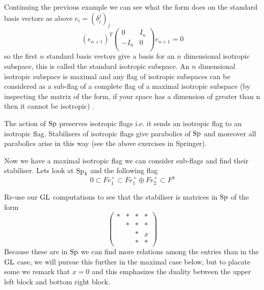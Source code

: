 \begin{example}
    Continuing the previous example we can see what the form does on the standard basis vectors as above \(e_i = (\delta_i^j)_{j}\)
        \[(e_{n+1})^T\begin{pmatrix}
            0 & I_n \\
            -I_n & 0\\
        \end{pmatrix}e_{n+1} = 0\] 
        so the first \(n\) standard basis vectors give a basis for an \(n\) dimensional isotropic subspace, this is called the standard isotropic subspace. An \(n\) dimensional isotropic subspace is maximal and any flag of isotropic subspaces can be considered as a sub-flag of a complete flag of a maximal isotropic subspace (by inspecting the matrix of the form, if your space has a dimension of greater than n then it cannot be isotropic) \cite[\S 8]{BuildingsClassicalGroups}.
\end{example}

The action of \(\operatorname{Sp}\) preserves isotropic flags i.e. it sends an isotropic flag to an isotropic flag. Stabilisers of isotropic flags give parabolics of \(\operatorname{Sp}\) and moreover all parabolics arise in this way (see the above exercises in Springer).

\begin{example}
        Now we have a maximal isotropic flag we can consider sub-flags and find their stabiliser. Lets look at \(\operatorname{Sp}_4\) and the following flag
        \[0 \subset Fe_1^+ \subset Fe_1^+ \oplus Fe^+_2 \subset F^4\]

        Re-use our \(\operatorname{GL}\) computations to see that the stabiliser is matrices in \(\operatorname{Sp}\) of the form
        \[\begin{pmatrix}
            *&*&*&* \\
             &*&*&* \\
             && *&x \\
             && *& *
        \end{pmatrix}\]
        Because these are in \(\operatorname{Sp}\) we can find more relations among the entries than in the \(\operatorname{GL}\) case, we will pursue this further in the maximal case below, but to placate some we remark that \(x = 0\) and this emphasizes the duality between the upper left block and bottom right block.
    \end{example}

